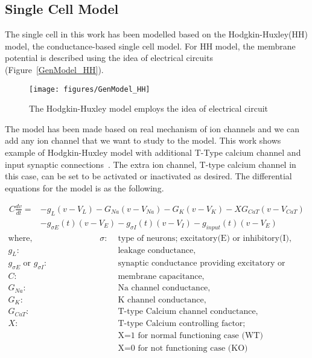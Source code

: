 \subsection{Single Cell Model}

The single cell in this work has been modelled based on the Hodgkin-Huxley(HH) model, the conductance-based single cell model. For HH model, the membrane potential is described using the idea of electrical circuits (Figure~\ref{GenModel_HH}). 
\begin{figure}
	\centering
	\texttt{[image: figures/GenModel\_HH]}
	\label{fig:GenModel_HH}
	\caption{The Hodgkin-Huxley model employs the idea of electrical circuit}
\end{figure}


The model has been made based on real mechanism of ion channels and we can add any ion channel that we want to study to the model. This work shows example of Hodgkin-Huxley model with additional T-Type calcium channel and input synaptic connections~\cite{hodgkin1952quantitative, wang1991model, paik2009spontaneous}. The extra ion channel, T-type calcium channel in this case, can be set to be activated or inactivated as desired. The differential equations for the model is as the following.

\begin{align*}
C\frac{dv}{dt}=&-g_L(v - V_L) - G_{Na}(v - V_{Na}) - G_K(v - V_K) - XG_{CaT}(v - V_{CaT}) \\
&- g_{\sigma E}(t)(v - V_E) - g_{\sigma I}(t)(v - V_I) - g_{input}(t)(v - V_E)
\end{align*}
\begin{align*}
	\text{where,} \hspace{8em} \sigma :& \text{ type of neurons; excitatory(E) or inhibitory(I),}  \\
	g_L :& \text{ leakage conductance,} \\
	g_{\sigma E} \text{ or } g_{\sigma I} :& \text{ synaptic conductance providing excitatory or inhibitory input} \\
	C :& \text{ membrane capacitance,}\\
	G_{Na} :& \text{ Na channel conductance,}\\
	G_{K} :& \text{ K channel conductance,}\\
	G_{CaT} :& \text{ T-type Calcium channel conductance,}\\
	X :& \text{ T-type Calcium controlling factor;}\\
	   &  \text{ X=1 for normal functioning case (WT) }\\
	   &  \text{ X=0 for not functioning case (KO) }\\
\end{align*}

